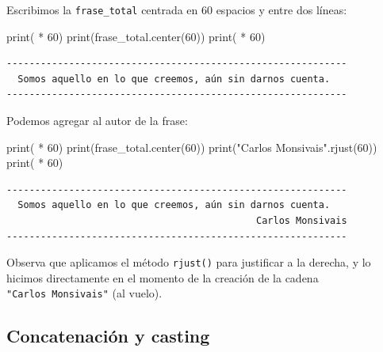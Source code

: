 \documentclass[
  spanish,
  letterpaper,
]{scrbook}
\newenvironment{Shaded}{\begin{snugshade}}{\end{snugshade}}
\newcommand{\BuiltInTok}[1]{\textcolor[rgb]{0.00,0.23,0.31}{#1}}
\newcommand{\DecValTok}[1]{\textcolor[rgb]{0.68,0.00,0.00}{#1}}
\newcommand{\NormalTok}[1]{\textcolor[rgb]{0.00,0.23,0.31}{#1}}
\newcommand{\OperatorTok}[1]{\textcolor[rgb]{0.37,0.37,0.37}{#1}}
\newcommand{\StringTok}[1]{\textcolor[rgb]{0.13,0.47,0.30}{#1}}
\theoremstyle{definition}
\theoremstyle{remark}
\begin{document}
Escribimos la \texttt{frase\_total} centrada en 60 espacios y entre dos
líneas:

\begin{Shaded}
\begin{Highlighting}[]
\BuiltInTok{print}\NormalTok{(}\StringTok{\textquotesingle{}{-}\textquotesingle{}} \OperatorTok{*} \DecValTok{60}\NormalTok{)}
\BuiltInTok{print}\NormalTok{(frase\_total.center(}\DecValTok{60}\NormalTok{))}
\BuiltInTok{print}\NormalTok{(}\StringTok{\textquotesingle{}{-}\textquotesingle{}} \OperatorTok{*} \DecValTok{60}\NormalTok{)}
\end{Highlighting}
\end{Shaded}

\begin{verbatim}
------------------------------------------------------------
  Somos aquello en lo que creemos, aún sin darnos cuenta.   
------------------------------------------------------------
\end{verbatim}

Podemos agregar al autor de la frase:

\begin{Shaded}
\begin{Highlighting}[]
\BuiltInTok{print}\NormalTok{(}\StringTok{\textquotesingle{}{-}\textquotesingle{}} \OperatorTok{*} \DecValTok{60}\NormalTok{)}
\BuiltInTok{print}\NormalTok{(frase\_total.center(}\DecValTok{60}\NormalTok{))}
\BuiltInTok{print}\NormalTok{(}\StringTok{"Carlos Monsivais"}\NormalTok{.rjust(}\DecValTok{60}\NormalTok{))}
\BuiltInTok{print}\NormalTok{(}\StringTok{\textquotesingle{}{-}\textquotesingle{}} \OperatorTok{*} \DecValTok{60}\NormalTok{)}
\end{Highlighting}
\end{Shaded}

\begin{verbatim}
------------------------------------------------------------
  Somos aquello en lo que creemos, aún sin darnos cuenta.   
                                            Carlos Monsivais
------------------------------------------------------------
\end{verbatim}

Observa que aplicamos el método \texttt{rjust()} para justificar a la
derecha, y lo hicimos directamente en el momento de la creación de la
cadena \texttt{"Carlos\ Monsivais"} (al vuelo).

\subsection{Concatenación y casting}\label{concatenaciuxf3n-y-casting}
\end{document}
